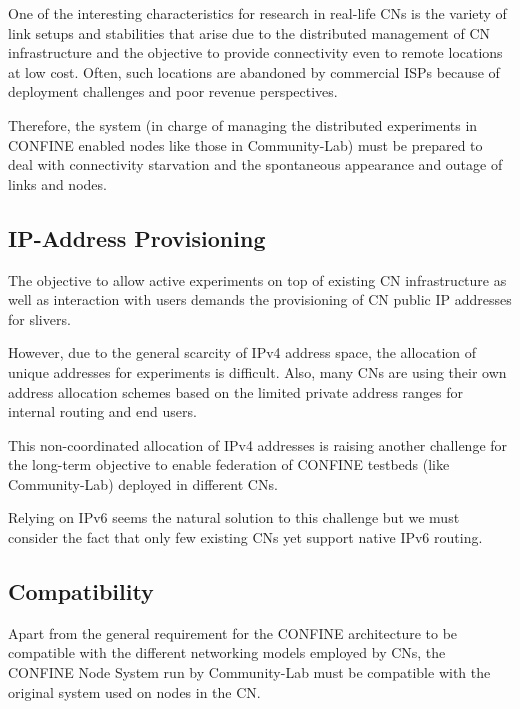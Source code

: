 \documentclass[conference]{IEEEtran}
\begin{document}
One of the interesting characteristics for research in real-life CNs
is the variety of link setups and stabilities that arise due to the
distributed management of CN infrastructure and the objective to provide
connectivity even to remote locations at low cost. Often, such
locations are abandoned by commercial ISPs because of deployment
challenges and poor revenue perspectives.

Therefore, the system (in charge of managing the distributed
experiments in CONFINE enabled nodes like those in Community-Lab) must be prepared to deal with
connectivity starvation and the spontaneous appearance and outage of
links and nodes.


\subsection{IP-Address Provisioning}

The objective to allow active experiments on top of existing CN
infrastructure as well as interaction with users demands the
provisioning of CN public IP addresses for slivers.

However, due to the general scarcity of IPv4 address space, the
allocation of unique addresses for experiments is difficult. Also,
many CNs are using their own address allocation schemes based on the
limited private address ranges for internal routing and end users.

This non-coordinated allocation of IPv4 addresses is raising another
challenge for the long-term objective to enable federation of CONFINE
testbeds (like Community-Lab) deployed in different CNs.

Relying on IPv6 seems the natural solution to this challenge but we must
consider the fact that only few existing CNs yet support native IPv6
routing.

\subsection{Compatibility}

Apart from the general requirement for the CONFINE architecture to be
compatible with the different networking models employed by CNs, the
CONFINE Node System run by Community-Lab must be compatible with the original system used on
nodes in the CN.
\end{document}
